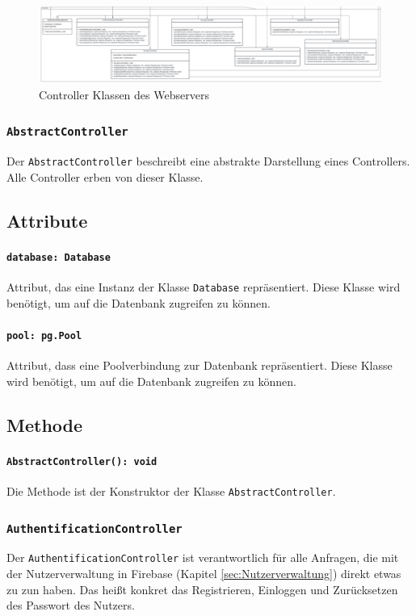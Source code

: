 \documentclass{entwurfsheft}
\begin{document}
\begin{sloppypar}
\begin{figure}[htp]
    \centering
    \includegraphics[width = 1\textwidth]{images/webserver/controller.pdf}
    \caption{Controller Klassen des Webservers}
    \label{fig:controller}
\end{figure}

\subsubsection{\texttt{AbstractController}}\label{sec:AbstractController}
Der \texttt{AbstractController} beschreibt eine abstrakte Darstellung eines Controllers. Alle Controller erben von dieser Klasse.
\subsection*{Attribute}
\paragraph{\texttt{database: Database}}
Attribut, das eine Instanz der Klasse \texttt{Database} repräsentiert. Diese Klasse wird benötigt, um auf die Datenbank zugreifen zu können.
\paragraph{\texttt{pool: pg.Pool}}
Attribut, dass eine Poolverbindung zur Datenbank repräsentiert. Diese Klasse wird benötigt, um auf die Datenbank zugreifen zu können.
\subsection*{Methode}
\paragraph{\texttt{AbstractController(): void}}
Die Methode ist der Konstruktor der Klasse \texttt{AbstractControl\-ler}.

\subsubsection{\texttt{AuthentificationController}}\label{sec:AuthentificationController}
Der \texttt{AuthentificationController} ist verantwortlich für alle Anfragen, die mit der Nutzerverwaltung in Firebase (Kapitel \ref{sec:Nutzerverwaltung}) direkt etwas zu zun haben. Das heißt konkret das Registrieren, Einloggen und Zurücksetzen des Passwort des Nutzers.

\end{sloppypar}
\end{document}
